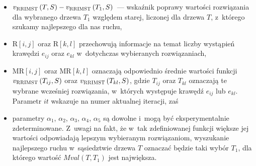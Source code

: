 \begin{itemize}
	\item $v_{\textsc{RRIMST}} \left( T, S \right) - v_{\textsc{RRIMST}} \left( T_{1}, S \right)$~--- wskaźnik poprawy wartości rozwiązania dla wybranego drzewa $T_{1}$ względem starej, liczonej dla drzewa $T$, z~którego szukamy najlepszego dla nas ruchu,
	\item $\text{R} \left[ i, j \right]$ oraz $\text{R} \left[ k, l \right]$ przechowują informacje na temat liczby wystąpień krawędzi $e_{ij}$ oraz $e_{kl}$ w~dotychczas wybieranych rozwiązaniach,
	\item $\text{MR} \left[ i, j \right]$ oraz $\text{MR} \left[ k, l \right]$ oznaczają odpowiednio średnie wartości funkcji $v_{\textsc{RRIMST}} \left( T_{ij}, S \right)$ oraz $v_{\textsc{RRIMST}} \left( T_{kl}, S \right)$, gdzie $T_{ij}$ oraz $T_{kl}$ oznaczają te wybrane wcześniej rozwiązania, w~których występuje krawędź $e_{ij}$ lub $e_{kl}$.
	Parametr $it$ wskazuje na numer aktualnej iteracji, zaś
	\item parametry $\alpha_{1}$, $\alpha_{2}$, $\alpha_{3}$, $\alpha_{4}$, $\alpha_{5}$ są dowolne i~mogą być eksperymentalnie zdeterminowane.
	Z~uwagi na fakt, że w~tak zdefiniowanej funkcji większe jej wartości odpowiadają lepszym wybieranym rozwiązaniom, wyszukanie najlepszego ruchu w~sąsiedztwie drzewa $T$ oznaczać będzie taki wybór $T_{1}$, dla którego wartość $Mval  \left( T, T_{1} \right)$ jest największa.
\end{itemize}

